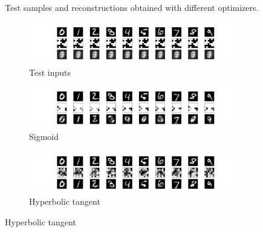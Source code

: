 \documentclass[preprint,5p,compress]{elsarticle}
\begin{document}
\begin{figure}[htbp]
  \caption{\label{Fig.optimizers}Test samples and reconstructions obtained with different optimizers.}
\end{figure}

\begin{figure}[htbp]
  \centering
  \begin{subfigure}{0.48\textwidth}
    \includegraphics[width=\textwidth,trim={14em 18em 14em 2em},clip]{basic-36-tanh-sgd-xent.pdf}
    \caption{\label{Fig.act.orig}Test inputs}
  \end{subfigure}

  \vspace{1em}
  
  \begin{subfigure}{0.48\textwidth}
    \includegraphics[width=\textwidth,trim={14em 2em 14em 19em},clip]{basic-36-sigmoid-rmsprop-xent.pdf}
    \caption{\label{Fig.act.sigm}Sigmoid}
  \end{subfigure}
  \begin{subfigure}{0.48\textwidth}
    \includegraphics[width=\textwidth,trim={14em 2em 14em 19em},clip]{basic-36-tanh-rmsprop-xent.pdf}
    \caption{\label{Fig.act.tanh}Hyperbolic tangent}
  \end{subfigure}

  \vspace{1em}
  

\end{figure}
\end{document}
